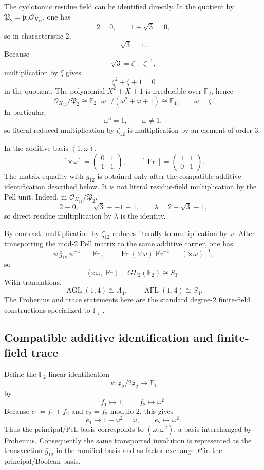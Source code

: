 \documentclass[11pt]{article}
\theoremstyle{remark}
\newcommand{\F}{\mathbb F}
\newcommand{\OO}{\mathcal O}
\newcommand{\Fr}{\operatorname{Fr}}
\begin{document}
The cyclotomic residue field can be identified directly.  In the quotient by
\(\mathfrak P_2=\mathfrak p_2\OO_{K_{12}}\), one has
\[
2=0,
\qquad
1+\sqrt3=0,
\]
so in characteristic $2$,
\[
\sqrt3=1.
\]
Because
\[
\sqrt3=\zeta+\zeta^{-1},
\]
multiplication by $\zeta$ gives
\[
\zeta^2+\zeta+1=0
\]
in the quotient.  The polynomial $X^2+X+1$ is irreducible over $\F_2$, hence
\[
\boxed{
\OO_{K_{12}}/\mathfrak P_2
\cong \F_2[\omega]/(\omega^2+\omega+1)
\cong\F_4,}
\qquad \omega=\bar\zeta.
\]
In particular,
\[
\omega^3=1,
\qquad \omega\ne1,
\]
so literal reduced multiplication by $\zeta_{12}$ is multiplication by an
element of order $3$.

In the additive basis $(1,\omega)$,
\[
[\times\omega]=\begin{pmatrix}0&1\\1&1\end{pmatrix},
\qquad
[\Fr]=\begin{pmatrix}1&1\\0&1\end{pmatrix}.
\]
The matrix equality with $\bar g_{12}$ is obtained only after the compatible
additive identification described below.  It is not literal residue-field
multiplication by the Pell unit.  Indeed, in $\OO_{K_{12}}/\mathfrak P_2$,
\[
2\equiv0,
\qquad
\sqrt3\equiv-1\equiv1,
\qquad
\lambda=2+\sqrt3\equiv1,
\]
so direct residue multiplication by $\lambda$ is the identity.

By contrast, multiplication by $\zeta_{12}$ reduces literally to
multiplication by $\omega$.  After transporting the mod-$2$ Pell matrix to the
same additive carrier, one has
\[
\boxed{\psi\,\bar g_{12}\,\psi^{-1}=\Fr},
\qquad
\Fr(\times\omega)\Fr^{-1}=(\times\omega)^{-1},
\]
so
\[
\langle\times\omega,\Fr\rangle
=GL_2(\F_2)\cong S_3.
\]
With translations,
\[
\operatorname{AGL}(1,4)\cong A_4,
\qquad
\operatorname{A\Gamma L}(1,4)\cong S_4.
\]
The Frobenius and trace statements here are the standard degree-$2$
finite-field constructions specialized to $\F_4$ \cite{LidlNiederreiter}.

\subsection{Compatible additive identification and finite-field trace}

Define the $\F_2$-linear identification
\[
\psi:\mathfrak p_2/2\mathfrak p_2\longrightarrow\F_4
\]
by
\[
\boxed{f_1\longmapsto1,
\qquad f_2\longmapsto\omega^2.}
\]
Because $e_1=f_1+f_2$ and $e_2=f_2$ modulo $2$, this gives
\[
e_1\longmapsto1+\omega^2=\omega,
\qquad
e_2\longmapsto\omega^2.
\]
Thus the principal/Pell basis corresponds to $(\omega,\omega^2)$, a basis
interchanged by Frobenius.  Consequently the same transported involution is
represented as the transvection $\bar g_{12}$ in the ramified basis and as
factor exchange $P$ in the principal/Boolean basis.
\end{document}
